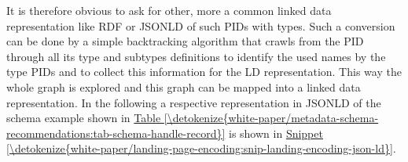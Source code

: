 \documentclass[a4paper,10pt,english]{sphinxmanual}
\begin{document}
\sphinxAtStartPar
It is therefore obvious to ask for other, more a common linked data
representation like RDF or JSON\sphinxhyphen{}LD of such PIDs with types. Such a
conversion can be done by a simple backtracking algorithm that crawls
from the PID through all its type and subtypes definitions to identify
the used names by the type PIDs and to collect this information for the
LD representation. This way the whole graph is explored and this graph
can be mapped into a linked data representation. In the following a
respective representation in JSON\sphinxhyphen{}LD of the schema example shown in
\hyperref[\detokenize{white-paper/metadata-schema-recommendations:tab-schema-handle-record}]{Table \ref{\detokenize{white-paper/metadata-schema-recommendations:tab-schema-handle-record}}} is shown in
\hyperref[\detokenize{white-paper/landing-page-encoding:snip-landing-encoding-json-ld}]{Snippet \ref{\detokenize{white-paper/landing-page-encoding:snip-landing-encoding-json-ld}}}.
\def\sphinxLiteralBlockLabel{\label{\detokenize{white-paper/landing-page-encoding:snip-landing-encoding-json-ld}}}
\end{document}

